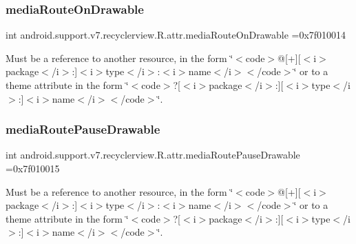 \subsubsection{\texorpdfstring{media\+Route\+On\+Drawable}{mediaRouteOnDrawable}}
{\footnotesize\ttfamily int android.\+support.\+v7.\+recyclerview.\+R.\+attr.\+media\+Route\+On\+Drawable =0x7f010014\hspace{0.3cm}{\ttfamily [static]}}

Must be a reference to another resource, in the form \char`\"{}$<$code$>$@\mbox{[}+\mbox{]}\mbox{[}$<$i$>$package$<$/i$>$\+:\mbox{]}$<$i$>$type$<$/i$>$\+:$<$i$>$name$<$/i$>$$<$/code$>$\char`\"{} or to a theme attribute in the form \char`\"{}$<$code$>$?\mbox{[}$<$i$>$package$<$/i$>$\+:\mbox{]}\mbox{[}$<$i$>$type$<$/i$>$\+:\mbox{]}$<$i$>$name$<$/i$>$$<$/code$>$\char`\"{}. \mbox{\label{classandroid_1_1support_1_1v7_1_1recyclerview_1_1R_1_1attr_a8e472a6e3d545d9d2c008a2c359fc530}} 
\subsubsection{\texorpdfstring{media\+Route\+Pause\+Drawable}{mediaRoutePauseDrawable}}
{\footnotesize\ttfamily int android.\+support.\+v7.\+recyclerview.\+R.\+attr.\+media\+Route\+Pause\+Drawable =0x7f010015\hspace{0.3cm}{\ttfamily [static]}}

Must be a reference to another resource, in the form \char`\"{}$<$code$>$@\mbox{[}+\mbox{]}\mbox{[}$<$i$>$package$<$/i$>$\+:\mbox{]}$<$i$>$type$<$/i$>$\+:$<$i$>$name$<$/i$>$$<$/code$>$\char`\"{} or to a theme attribute in the form \char`\"{}$<$code$>$?\mbox{[}$<$i$>$package$<$/i$>$\+:\mbox{]}\mbox{[}$<$i$>$type$<$/i$>$\+:\mbox{]}$<$i$>$name$<$/i$>$$<$/code$>$\char`\"{}. \mbox{\label{classandroid_1_1support_1_1v7_1_1recyclerview_1_1R_1_1attr_a01df66b1b743f09fb764ac3156033696}} 
